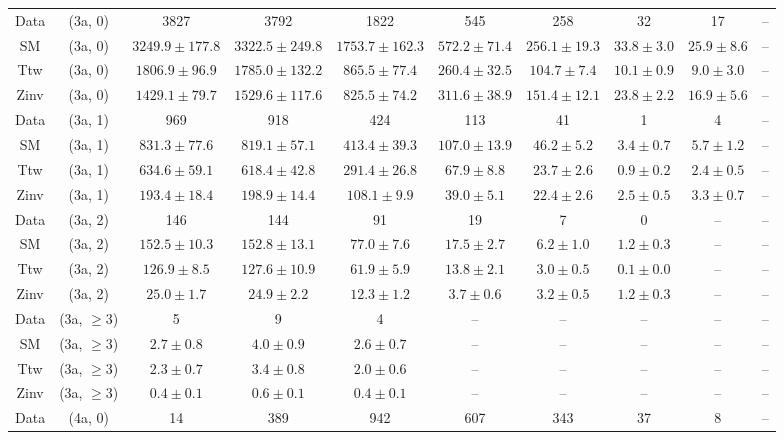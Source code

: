 \begin{table}[h!]
{\begin{tabular}{cccccccccc}
	Data & (3a, 0) & 3827 & 3792 & 1822 & 545 & 258 & 32 & 17 & -- \\[0.5ex] 
	SM & (3a, 0) & $3249.9\pm 177.8$ & $3322.5\pm 249.8$ & $1753.7\pm 162.3$ & $572.2\pm 71.4$ & $256.1\pm 19.3$ & $33.8\pm 3.0$ & $25.9\pm 8.6$ & -- \\[0.5ex] 
	Ttw & (3a, 0) & $1806.9\pm 96.9$ & $1785.0\pm 132.2$ & $865.5\pm 77.4$ & $260.4\pm 32.5$ & $104.7\pm 7.4$ & $10.1\pm 0.9$ & $9.0\pm 3.0$ & -- \\[0.5ex] 
	Zinv & (3a, 0) & $1429.1\pm 79.7$ & $1529.6\pm 117.6$ & $825.5\pm 74.2$ & $311.6\pm 38.9$ & $151.4\pm 12.1$ & $23.8\pm 2.2$ & $16.9\pm 5.6$ & -- \\[0.5ex] 
	Data & (3a, 1) & 969 & 918 & 424 & 113 & 41 & 1 & 4 & -- \\[0.5ex] 
	SM & (3a, 1) & $831.3\pm 77.6$ & $819.1\pm 57.1$ & $413.4\pm 39.3$ & $107.0\pm 13.9$ & $46.2\pm 5.2$ & $3.4\pm 0.7$ & $5.7\pm 1.2$ & -- \\[0.5ex] 
	Ttw & (3a, 1) & $634.6\pm 59.1$ & $618.4\pm 42.8$ & $291.4\pm 26.8$ & $67.9\pm 8.8$ & $23.7\pm 2.6$ & $0.9\pm 0.2$ & $2.4\pm 0.5$ & -- \\[0.5ex] 
	Zinv & (3a, 1) & $193.4\pm 18.4$ & $198.9\pm 14.4$ & $108.1\pm 9.9$ & $39.0\pm 5.1$ & $22.4\pm 2.6$ & $2.5\pm 0.5$ & $3.3\pm 0.7$ & -- \\[0.5ex] 
	Data & (3a, 2) & 146 & 144 & 91 & 19 & 7 & 0 & -- & -- \\[0.5ex] 
	SM & (3a, 2) & $152.5\pm 10.3$ & $152.8\pm 13.1$ & $77.0\pm 7.6$ & $17.5\pm 2.7$ & $6.2\pm 1.0$ & $1.2\pm 0.3$ & -- & -- \\[0.5ex] 
	Ttw & (3a, 2) & $126.9\pm 8.5$ & $127.6\pm 10.9$ & $61.9\pm 5.9$ & $13.8\pm 2.1$ & $3.0\pm 0.5$ & $0.1\pm 0.0$ & -- & -- \\[0.5ex] 
	Zinv & (3a, 2) & $25.0\pm 1.7$ & $24.9\pm 2.2$ & $12.3\pm 1.2$ & $3.7\pm 0.6$ & $3.2\pm 0.5$ & $1.2\pm 0.3$ & -- & -- \\[0.5ex] 
	Data & (3a, $\ge3$) & 5 & 9 & 4 & -- & -- & -- & -- & -- \\[0.5ex] 
	SM & (3a, $\ge3$) & $2.7\pm 0.8$ & $4.0\pm 0.9$ & $2.6\pm 0.7$ & -- & -- & -- & -- & -- \\[0.5ex] 
	Ttw & (3a, $\ge3$) & $2.3\pm 0.7$ & $3.4\pm 0.8$ & $2.0\pm 0.6$ & -- & -- & -- & -- & -- \\[0.5ex] 
	Zinv & (3a, $\ge3$) & $0.4\pm 0.1$ & $0.6\pm 0.1$ & $0.4\pm 0.1$ & -- & -- & -- & -- & -- \\[0.5ex] 
	Data & (4a, 0) & 14 & 389 & 942 & 607 & 343 & 37 & 8 & -- \\[0.5ex] 

\end{tabular}}
\end{table}
